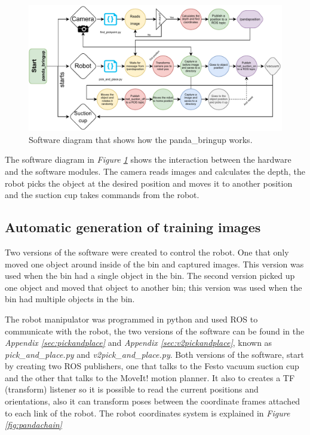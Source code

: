 \begin{figure}[h]
 \centering
 \includegraphics[width=1\textwidth]{graphics/softwareDiagram.pdf}
 \caption{Software diagram that shows how the panda\_bringup works.}
 \label{fig:softwarediagram}
\end{figure}
The software diagram in \textit{Figure \ref{fig:softwarediagram}} shows the interaction between the hardware and the software modules. The camera reads images and calculates the depth, the robot picks the object at the desired position and moves it to another position and the suction cup takes commands from the robot.

\subsection{Automatic generation of training images}\label{sec:robot}
Two versions of the software were created to control the robot. One that only moved one object around inside of the bin and captured images. This version was used when the bin had a single object in the bin. The second version picked up one object and moved that object to another bin; this version was used when the bin had multiple objects in the bin.

The robot manipulator was programmed in python and used ROS to communicate with the robot, the two versions of the software can be found in the \textit{Appendix \ref{sec:pickandplace}} and \textit{Appendix \ref{sec:v2pickandplace}}, known as \textit{pick\_and\_place.py} and \textit{v2pick\_and\_place.py}. 
Both versions of the software, start by creating two ROS publishers, one that talks to the Festo vacuum suction cup and the other that talks to the MoveIt! motion planner. 
It also to creates a TF (transform) listener so it is possible to read the current positions and orientations, also it can transform poses between the coordinate frames attached to each link of the robot. The robot coordinates system is explained in \textit{Figure \ref{fig:pandachain}} 

